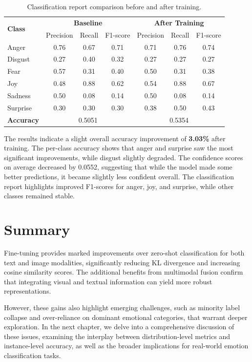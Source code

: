 \begin{table}[ht]
    \centering
    \begin{tabular}{lccc|ccc}
        \hline
        \multirow{2}{*}{\textbf{Class}} & \multicolumn{3}{c|}{\textbf{Baseline}} & \multicolumn{3}{c}{\textbf{After Training}} \\
        & Precision & Recall & F1-score & Precision & Recall & F1-score \\
        \hline
        Anger & 0.76 & 0.67 & 0.71 & 0.71 & 0.76 & 0.74 \\
        Disgust & 0.27 & 0.40 & 0.32 & 0.27 & 0.27 & 0.27 \\
        Fear & 0.57 & 0.31 & 0.40 & 0.50 & 0.31 & 0.38 \\
        Joy & 0.48 & 0.88 & 0.62 & 0.54 & 0.88 & 0.67 \\
        Sadness & 0.50 & 0.08 & 0.14 & 0.50 & 0.08 & 0.14 \\
        Surprise & 0.30 & 0.30 & 0.30 & 0.38 & 0.50 & 0.43 \\
        \hline
        \textbf{Accuracy} & \multicolumn{3}{c|}{0.5051} & \multicolumn{3}{c}{0.5354} \\
        \hline
    \end{tabular}
    \caption{Classification report comparison before and after training.}
    \label{tab:classification_report}
\end{table}

The results indicate a slight overall accuracy improvement of \textbf{3.03\%} after training. The per-class accuracy shows that anger and surprise saw the most significant improvements, while disgust slightly degraded. The confidence scores on average decreased by 0.0552, suggesting that while the model made some better predictions, it became slightly less confident overall. The classification report highlights improved F1-scores for anger, joy, and surprise, while other classes remained stable.



\section{Summary}
\label{sec:conclusion}

Fine-tuning provides marked improvements over zero-shot classification for both text and image modalities, significantly reducing KL divergence and increasing cosine similarity scores. The additional benefits from multimodal fusion confirm that integrating visual and textual information can yield more robust representations.
\newline

However, these gains also highlight emerging challenges, such as minority label collapse and over-reliance on dominant emotional categories, that warrant deeper exploration. In the next chapter, we delve into a comprehensive discussion of these issues, examining the interplay between distribution-level metrics and instance-level accuracy, as well as the broader implications for real-world emotion classification tasks.






